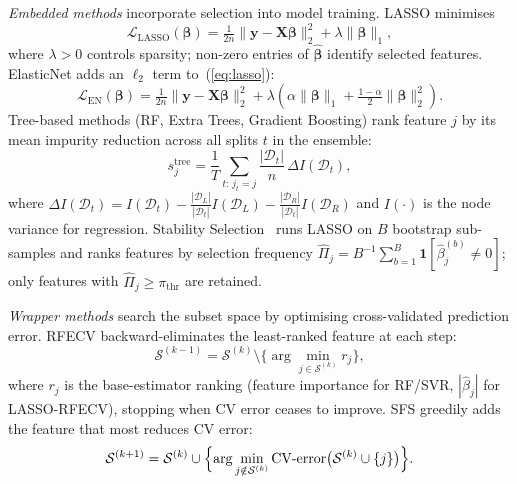 \documentclass[12pt, a4paper]{article}
\begin{document}
\emph{Embedded methods} incorporate selection into model training.
LASSO minimises
\begin{equation}
    \mathcal{L}_{\mathrm{LASSO}}(\boldsymbol{\beta})
    = \tfrac{1}{2n}\|\mathbf{y} - \mathbf{X}\boldsymbol{\beta}\|_2^2
    + \lambda\|\boldsymbol{\beta}\|_1,
    \label{eq:lasso}
\end{equation}
where $\lambda > 0$ controls sparsity; non-zero entries of $\hat{\boldsymbol{\beta}}$
identify selected features.
ElasticNet adds an $\ell_2$ term to~(\ref{eq:lasso}):
\begin{equation}
    \mathcal{L}_{\mathrm{EN}}(\boldsymbol{\beta})
    = \tfrac{1}{2n}\|\mathbf{y} - \mathbf{X}\boldsymbol{\beta}\|_2^2
    + \lambda\!\left(\alpha\|\boldsymbol{\beta}\|_1
      + \tfrac{1-\alpha}{2}\|\boldsymbol{\beta}\|_2^2\right).
    \label{eq:elasticnet}
\end{equation}
Tree-based methods (RF, Extra Trees, Gradient Boosting) rank feature $j$ by its
mean impurity reduction across all splits $t$ in the ensemble:
\begin{equation}
    s_j^{\mathrm{tree}} = \frac{1}{T}\sum_{t:\,j_t=j}
        \frac{|\mathcal{D}_t|}{n}\,\Delta I(\mathcal{D}_t),
    \label{eq:impurity}
\end{equation}
where $\Delta I(\mathcal{D}_t)=I(\mathcal{D}_t)
  -\tfrac{|\mathcal{D}_L|}{|\mathcal{D}_t|}I(\mathcal{D}_L)
  -\tfrac{|\mathcal{D}_R|}{|\mathcal{D}_t|}I(\mathcal{D}_R)$
and $I(\cdot)$ is the node variance for regression.
Stability Selection~\cite{Meinshausen2009} runs LASSO on $B$ bootstrap sub-samples
and ranks features by selection frequency
$\hat{\Pi}_j = B^{-1}\sum_{b=1}^{B}\mathbf{1}[\hat{\beta}_j^{(b)}\neq 0]$;
only features with $\hat{\Pi}_j \geq \pi_{\mathrm{thr}}$ are retained.

\emph{Wrapper methods} search the subset space by optimising cross-validated
prediction error.
RFECV backward-eliminates the least-ranked feature at each step:
\begin{equation}
    \mathcal{S}^{(k-1)} = \mathcal{S}^{(k)}
        \setminus \bigl\{\arg\min_{j\in\mathcal{S}^{(k)}} r_j\bigr\},
    \label{eq:rfecv}
\end{equation}
where $r_j$ is the base-estimator ranking (feature importance for RF/SVR,
$|\hat{\beta}_j|$ for LASSO-RFECV), stopping when CV error ceases to improve.
SFS greedily adds the feature that most reduces CV error:
\begin{equation}
    \mathcal{S}^{(k+1)} = \mathcal{S}^{(k)} \cup
        \Bigl\{\arg\min_{j\notin\mathcal{S}^{(k)}}
            \mathrm{CV\text{-}error}\bigl(\mathcal{S}^{(k)}\cup\{j\}\bigr)\Bigr\}.
    \label{eq:sfs}
\end{equation}
\end{document}
